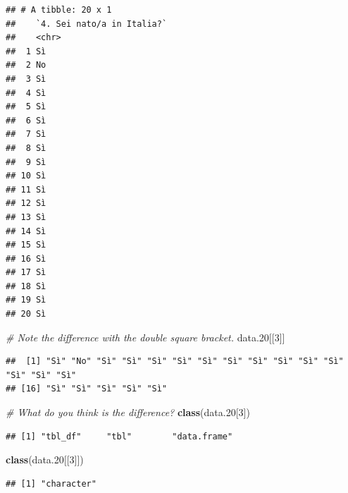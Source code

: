 \documentclass[
]{book}
\newenvironment{Shaded}{\begin{snugshade}}{\end{snugshade}}
\newcommand{\CommentTok}[1]{\textcolor[rgb]{0.56,0.35,0.01}{\textit{#1}}}
\newcommand{\DecValTok}[1]{\textcolor[rgb]{0.00,0.00,0.81}{#1}}
\newcommand{\FloatTok}[1]{\textcolor[rgb]{0.00,0.00,0.81}{#1}}
\newcommand{\FunctionTok}[1]{\textcolor[rgb]{0.13,0.29,0.53}{\textbf{#1}}}
\newcommand{\NormalTok}[1]{#1}
\begin{document}
\begin{verbatim}
## # A tibble: 20 x 1
##    `4. Sei nato/a in Italia?`
##    <chr>                     
##  1 Sì                        
##  2 No                        
##  3 Sì                        
##  4 Sì                        
##  5 Sì                        
##  6 Sì                        
##  7 Sì                        
##  8 Sì                        
##  9 Sì                        
## 10 Sì                        
## 11 Sì                        
## 12 Sì                        
## 13 Sì                        
## 14 Sì                        
## 15 Sì                        
## 16 Sì                        
## 17 Sì                        
## 18 Sì                        
## 19 Sì                        
## 20 Sì
\end{verbatim}

\begin{Shaded}
\begin{Highlighting}[]
\CommentTok{\# Note the difference with the double square bracket.}
\NormalTok{data}\FloatTok{.20}\NormalTok{[[}\DecValTok{3}\NormalTok{]]}
\end{Highlighting}
\end{Shaded}

\begin{verbatim}
##  [1] "Sì" "No" "Sì" "Sì" "Sì" "Sì" "Sì" "Sì" "Sì" "Sì" "Sì" "Sì" "Sì" "Sì" "Sì"
## [16] "Sì" "Sì" "Sì" "Sì" "Sì"
\end{verbatim}

\begin{Shaded}
\begin{Highlighting}[]
\CommentTok{\# What do you think is the difference?}
\FunctionTok{class}\NormalTok{(data}\FloatTok{.20}\NormalTok{[}\DecValTok{3}\NormalTok{])}
\end{Highlighting}
\end{Shaded}

\begin{verbatim}
## [1] "tbl_df"     "tbl"        "data.frame"
\end{verbatim}

\begin{Shaded}
\begin{Highlighting}[]
\FunctionTok{class}\NormalTok{(data}\FloatTok{.20}\NormalTok{[[}\DecValTok{3}\NormalTok{]])}
\end{Highlighting}
\end{Shaded}

\begin{verbatim}
## [1] "character"
\end{verbatim}
\end{document}
